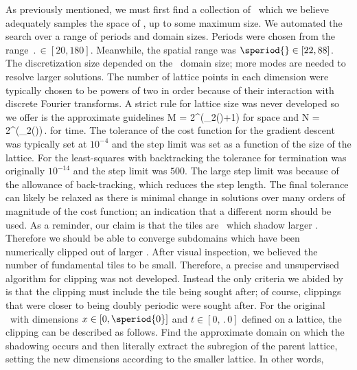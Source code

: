 As previously mentioned, we must first find a collection of \twots\ which we believe
adequately samples the space of \twots, up to some maximum size. We automated the search over a range
of periods and domain sizes. Periods were chosen from the range
$\period{}\in [20, 180]$. Meanwhile, the spatial range was $\speriod{} \in [22, 88]$. The discretization size
depended on the \spt\ domain size; more modes are needed to resolve larger solutions. The number
of lattice points in each dimension were typically chosen to be powers of two in order because of their interaction with discrete Fourier transforms. A strict rule for lattice size
was never developed so we offer is the approximate guidelines
\beq
M = 2^{(\log_2(\speriod{})+1)}
\eeq
for space and
\beq
N = 2^{(\log_2(\period{}))}\,.
\eeq
for time.
The tolerance of the cost function for the gradient descent was typically set at $10^{-4}$
and the step limit was set as a function of the size of the lattice. For the least-squares
with backtracking the tolerance for termination was originally $10^{-14}$ and the step limit was $500$. The large step limit was because of
the allowance of back-tracking, which reduces the step length.
The final tolerance can likely be relaxed as there is minimal change in solutions over many orders
of magnitude of the cost function; an indication that a different norm should be used.
As a reminder, our claim is that the tiles are \twots\ which shadow larger \twots.
Therefore we should be able to converge subdomains which have been numerically clipped out
of larger \twots. After visual inspection, we believed the number of fundamental tiles to
be small. Therefore, a precise and unsupervised algorithm for clipping was not developed.
Instead the only criteria we abided by is that the clipping must include the tile being
sought after; of course, clippings that were closer to being doubly periodic were sought after.
For the original \twot\ with dimensions $x \in [0, \speriod{0}]$ and $t \in [0, \period{0}]$ defined on a lattice, the
clipping can be described as follows. Find the approximate domain on which
the shadowing occurs and then literally extract the subregion of the parent lattice,
setting the new {\spt} dimensions according to the smaller lattice. In other words,
